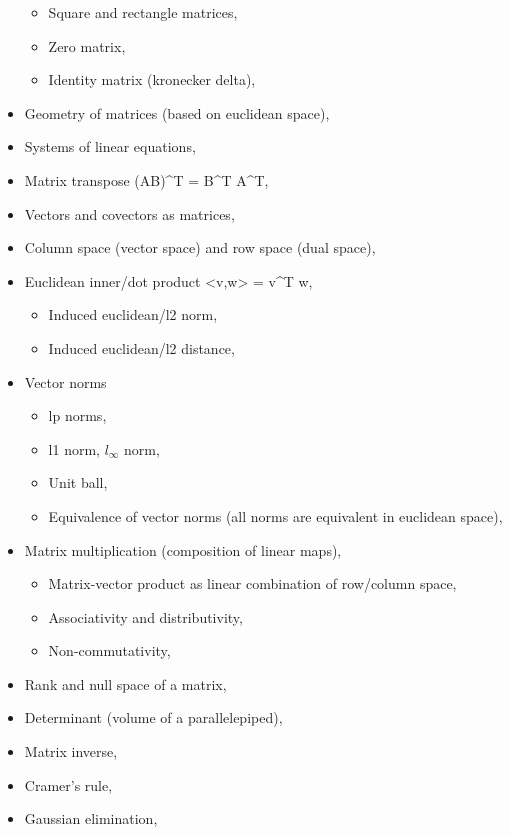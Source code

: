 \begin{itemize}
  \begin{itemize}
  \tightlist
  \item
    Square and rectangle matrices,
  \item
    Zero matrix,
  \item
    Identity matrix (kronecker delta),
  \end{itemize}
\item
  Geometry of matrices (based on euclidean space),
\item
  Systems of linear equations,
\item
  Matrix transpose (AB)\^{}T = B\^{}T A\^{}T,
\item
  Vectors and covectors as matrices,
\item
  Column space (vector space) and row space (dual space),
\item
  Euclidean inner/dot product \textless v,w\textgreater{} = v\^{}T w,

  \begin{itemize}
  \tightlist
  \item
    Induced euclidean/l2 norm,
  \item
    Induced euclidean/l2 distance,
  \end{itemize}
\item
  Vector norms

  \begin{itemize}
  \tightlist
  \item
    lp norms,
  \item
    l1 norm, \(l_{\infty}\) norm,
  \item
    Unit ball,
  \item
    Equivalence of vector norms (all norms are equivalent in euclidean
    space),
  \end{itemize}
\item
  Matrix multiplication (composition of linear maps),

  \begin{itemize}
  \tightlist
  \item
    Matrix-vector product as linear combination of row/column space,
  \item
    Associativity and distributivity,
  \item
    Non-commutativity,
  \end{itemize}
\item
  Rank and null space of a matrix,
\item
  Determinant (volume of a parallelepiped),
\item
  Matrix inverse,
\item
  Cramer's rule,
\item
  Gaussian elimination,


\end{itemize}
